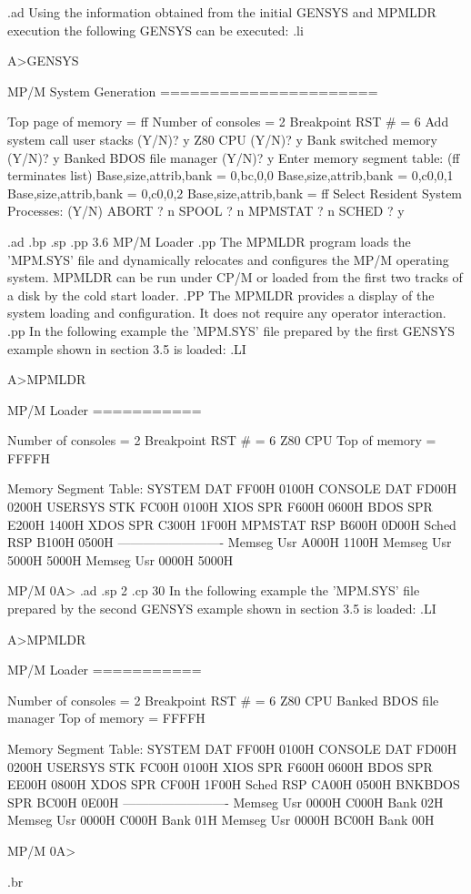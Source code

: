.ad
Using the information obtained from the initial GENSYS and MPMLDR
execution the following GENSYS can be executed:
.li

	A>GENSYS

	MP/M System Generation
	======================

	Top page of memory = ff
	Number of consoles = 2
	Breakpoint RST #   = 6
	Add system call user stacks (Y/N)? y
	Z80 CPU (Y/N)? y
	Bank switched memory (Y/N)? y
	Banked BDOS file manager (Y/N)? y
	Enter memory segment table: (ff terminates list)
	 Base,size,attrib,bank = 0,bc,0,0
	 Base,size,attrib,bank = 0,c0,0,1
	 Base,size,attrib,bank = 0,c0,0,2
	 Base,size,attrib,bank = ff
	Select Resident System Processes: (Y/N)
	ABORT    ? n
	SPOOL    ? n
	MPMSTAT  ? n
	SCHED    ? y

.ad
.bp
.sp
.pp
3.6 MP/M Loader
.pp
The MPMLDR program loads the 'MPM.SYS' file and dynamically relocates
and configures the MP/M operating system.  MPMLDR can be run
under CP/M
or loaded from the first two tracks of a disk by the cold start loader.
.PP
The MPMLDR provides a display of the system loading and configuration.
It does not require any operator interaction.
.pp
In the following example
the 'MPM.SYS' file prepared by the first GENSYS example shown in
section 3.5 is loaded:
.LI

	A>MPMLDR

	MP/M Loader
	===========

	Number of consoles = 2
	Breakpoint RST #   = 6
	Z80 CPU
	Top of memory      = FFFFH

	Memory Segment Table:
	SYSTEM  DAT  FF00H  0100H
	CONSOLE DAT  FD00H  0200H
	USERSYS STK  FC00H  0100H
	XIOS    SPR  F600H  0600H
	BDOS    SPR  E200H  1400H
	XDOS    SPR  C300H  1F00H
	MPMSTAT RSP  B600H  0D00H
	Sched   RSP  B100H  0500H
	-------------------------
	Memseg  Usr  A000H  1100H
	Memseg  Usr  5000H  5000H
	Memseg  Usr  0000H  5000H

	MP/M
 	0A>
.ad
.sp 2
.cp 30
In the following example
the 'MPM.SYS' file prepared by the second GENSYS example shown in
section 3.5 is loaded:
.LI

	A>MPMLDR

	MP/M Loader
	===========

	Number of consoles = 2
	Breakpoint RST #   = 6
	Z80 CPU
	Banked BDOS file manager
	Top of memory      =  FFFFH

	Memory Segment Table:
	SYSTEM  DAT  FF00H  0100H
	CONSOLE DAT  FD00H  0200H
	USERSYS STK  FC00H  0100H
	XIOS    SPR  F600H  0600H
	BDOS    SPR  EE00H  0800H
	XDOS    SPR  CF00H  1F00H
	Sched   RSP  CA00H  0500H
	BNKBDOS SPR  BC00H  0E00H
	-------------------------
	Memseg  Usr  0000H  C000H  Bank 02H
	Memseg  Usr  0000H  C000H  Bank 01H
	Memseg  Usr  0000H  BC00H  Bank 00H

	MP/M
	0A>

.br
